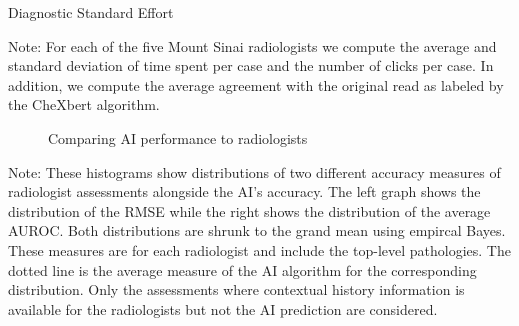 \begin{table}[H]
    \centering
    \caption{Diagnostic Standard Effort}
    
    \label{tab:diag_standard_effort}
    \noindent\begin{minipage}[t]{1\columnwidth}%
    {\scriptsize{}Note: For each of the five Mount Sinai radiologists we compute the average and standard deviation of time spent per case and the number of clicks per case. In addition, we compute the average agreement with the original read as labeled by the CheXbert algorithm.}%
    \end{minipage}
\end{table}

\begin{figure}[H]%
    \caption{Comparing AI performance to radiologists}%
    \label{fig:compare_performance}%
    \centering
    \qquad
\end{figure}
\begin{footnotesize}
  \noindent Note: These histograms show distributions of two different accuracy measures of radiologist assessments alongside the AI's accuracy. The left graph shows the distribution of the RMSE while the right shows the distribution of the average AUROC. Both distributions are shrunk to the grand mean using empircal Bayes. These measures are for each radiologist and include the top-level pathologies. The dotted line is the average measure of the AI algorithm for the corresponding distribution. Only the assessments where contextual history information is available for the radiologists but not the AI prediction are considered. 
\end{footnotesize}

